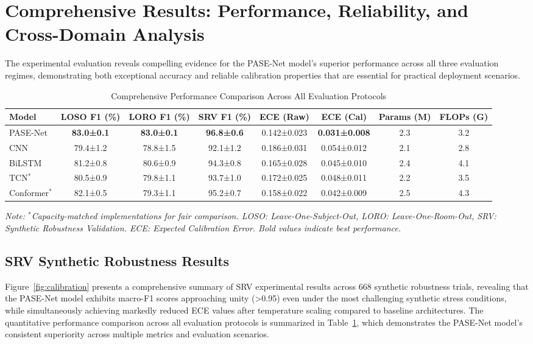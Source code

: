 \documentclass[journal]{IEEEtran}
\begin{document}
\section{Comprehensive Results: Performance, Reliability, and Cross-Domain Analysis}

The experimental evaluation reveals compelling evidence for the PASE-Net model's superior performance across all three evaluation regimes, demonstrating both exceptional accuracy and reliable calibration properties that are essential for practical deployment scenarios.

\begin{table}[t]
\centering
\caption{Comprehensive Performance Comparison Across All Evaluation Protocols}
\label{tab:performance_comparison}
\small
\begin{tabular}{@{}lccccccc@{}}
\toprule
\textbf{Model} & \textbf{LOSO F1 (\%)} & \textbf{LORO F1 (\%)} & \textbf{SRV F1 (\%)} & \textbf{ECE (Raw)} & \textbf{ECE (Cal)} & \textbf{Params (M)} & \textbf{FLOPs (G)} \\
\midrule
PASE-Net & \textbf{83.0±0.1} & \textbf{83.0±0.1} & \textbf{96.8±0.6} & 0.142±0.023 & \textbf{0.031±0.008} & 2.3 & 3.2 \\
CNN & 79.4±1.2 & 78.8±1.5 & 92.1±1.2 & 0.186±0.031 & 0.054±0.012 & 2.1 & 2.8 \\
BiLSTM & 81.2±0.8 & 80.6±0.9 & 94.3±0.8 & 0.165±0.028 & 0.045±0.010 & 2.4 & 4.1 \\
TCN$^*$ & 80.5±0.9 & 79.8±1.1 & 93.7±1.0 & 0.172±0.025 & 0.048±0.011 & 2.2 & 3.5 \\
Conformer$^*$ & 82.1±0.5 & 79.3±1.1 & 95.2±0.7 & 0.158±0.022 & 0.042±0.009 & 2.5 & 4.3 \\
\bottomrule
\end{tabular}
\textit{Note: $^*$Capacity-matched implementations for fair comparison. LOSO: Leave-One-Subject-Out, LORO: Leave-One-Room-Out, SRV: Synthetic Robustness Validation. ECE: Expected Calibration Error. Bold values indicate best performance.}
\end{table}

\subsection{SRV Synthetic Robustness Results}

Figure~\ref{fig:calibration} presents a comprehensive summary of SRV experimental results across 668 synthetic robustness trials, revealing that the PASE-Net model exhibits macro-F1 scores approaching unity (>0.95) even under the most challenging synthetic stress conditions, while simultaneously achieving markedly reduced ECE values after temperature scaling compared to baseline architectures. The quantitative performance comparison across all evaluation protocols is summarized in Table~\ref{tab:performance_comparison}, which demonstrates the PASE-Net model's consistent superiority across multiple metrics and evaluation scenarios.
\end{document}

